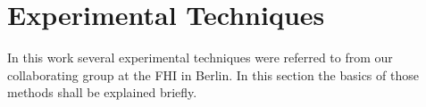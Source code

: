 \documentclass[11pt,DIV=13,BCOR=5mm,a4paper,headinclude]{scrbook}
\begin{document}
\appendix

\captionsetup{labelformat=myformat}
\def\thefigure{A.\arabic{figure}}
\def\thetable{A.\arabic{table}}
\section{Experimental Techniques}\label{exp_techniques}
In this work several experimental techniques were referred to from our collaborating group at the FHI in Berlin.
In this section the basics of those methods shall be explained briefly.
\end{document}
